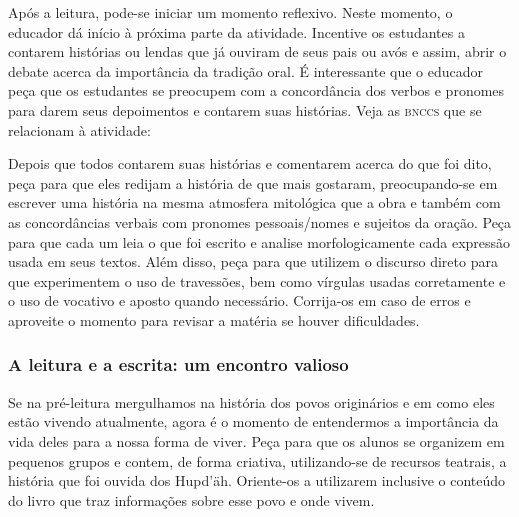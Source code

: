 \documentclass[11pt]{extarticle}
\begin{document}
Após a leitura, pode-se iniciar um momento reflexivo. Neste momento, o educador dá início à próxima parte da atividade. Incentive os estudantes a contarem histórias ou lendas que já ouviram de seus pais ou avós e assim, abrir o debate acerca da importância da tradição oral. É interessante que o educador peça que os estudantes se preocupem com a concordância dos verbos e pronomes para darem seus depoimentos e contarem suas histórias. Veja as \textsc{bnccs} que se relacionam à atividade: 



Depois que todos contarem suas histórias e comentarem acerca do que foi dito, peça para que eles redijam a história de que mais gostaram, preocupando-se em escrever uma história na mesma atmosfera mitológica que a obra e também com as concordâncias verbais com pronomes pessoais/nomes e sujeitos da oração. Peça para que cada um leia o que foi escrito e analise morfologicamente cada expressão usada em seus textos. Além disso, peça para que utilizem o discurso direto para que experimentem o uso de travessões, bem como vírgulas usadas corretamente e o uso de vocativo e aposto quando necessário. Corrija-os em caso de erros e aproveite o momento para revisar a matéria se houver dificuldades.

\subsubsection{A leitura e a escrita: um encontro valioso}

Se na pré-leitura mergulhamos na história dos povos originários e em como eles estão vivendo atualmente, agora é o momento de entendermos a importância da vida deles para a nossa forma de viver. Peça para que os alunos se organizem em pequenos grupos e contem, de forma criativa, utilizando-se de recursos teatrais, a história que foi ouvida dos Hupd'äh. Oriente-os a utilizarem inclusive o conteúdo do livro que traz informações sobre esse povo e onde vivem.
\end{document}
